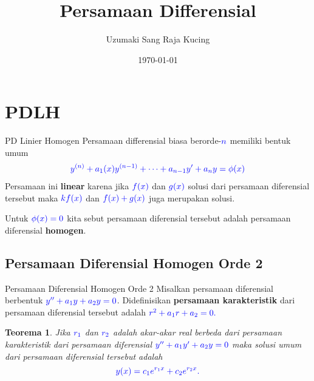 \documentclass{beamer}
\title[Persamaan Differensial]{Persamaan Differensial} %
\author{Uzumaki Sang Raja Kucing} %
\institute[ITB] %
{
Institut Teknologi Bandung \\ %
\medskip
\textit{widyacantik@gmail.com} %
}
\date{\today} %
\newtheorem{teorema}{Teorema}
\begin{document}
\begin{frame}
\titlepage %
\end{frame}
\section{PDLH}
\begin{frame}{PD Linier Homogen}
Persamaan differensial biasa berorde-$\color{blue}n$ memiliki bentuk umum
\begin{align*}
\color{blue} y^{(n)}+a_1(x)y^{(n-1)}+\cdots+a_{n-1}y'+a_ny=\phi(x)
\end{align*}
Persamaan ini \textbf{linear} karena jika $\color{blue}f(x)$ dan $\color{blue}g(x)$ solusi dari persamaan diferensial tersebut maka $\color{blue}kf(x)$ dan $\color{blue}f(x)+g(x)$ juga merupakan solusi. 

Untuk $\color{blue}\phi(x)=0$ kita sebut persamaan diferensial tersebut adalah persamaan diferensial \textbf{homogen}.
\end{frame}
\subsection{Persamaan Diferensial Homogen Orde 2}
\begin{frame}{Persamaan Diferensial Homogen Orde 2}
	Misalkan persamaan diferensial berbentuk $\color{blue}y''+a_1y+a_2y=0$. \pause
	Didefinisikan \textbf{persamaan karakteristik } dari persamaan diferensial tersebut adalah $\color{blue} r^2+a_1r+a_2=0.$ \pause 
	\begin{teorema}
		Jika $\color{blue}r_1$ dan $\color{blue}r_2$ adalah akar-akar real berbeda dari persamaan karakteristik dari persamaan diferensial $\color{blue}y''+a_1y'+a_2y=0$ maka solusi umum dari persamaan diferensial tersebut adalah $$\color{blue}y(x)=c_1e^{r_1x}+c_2e^{r_2x}.$$
	\end{teorema} \pause 
\end{frame}
\end{document}
